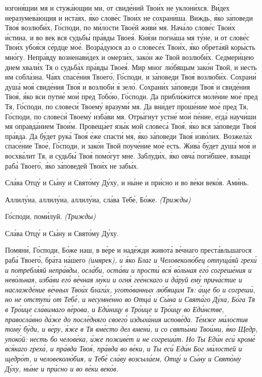 изгоня́щии мя и стужа́ющии ми, от свиде́ний Твои́х не уклони́хся. Ви́дех
неразумева́ющия и иста́ях, я́ко слове́с Твои́х не сохрани́ша. Виждь,
я́ко за́поведи Твоя́ возлюби́х, Го́споди, по ми́лости Твое́й живи́ мя.
Нача́ло слове́с Твои́х и́стина, и во век вся судьбы́ пра́вды Твоея́. Кня́зи
погна́ша мя ту́не, и от слове́с Твои́х убоя́ся се́рдце мое́. Возра́дуюся аз о
словесе́х Твои́х, я́ко обрета́яй коры́сть мно́гу. Непра́вду возненави́дех и
омерзи́х, зако́н же Твой возлюби́х. Седмери́цею днем хвали́х Тя о
судьба́х пра́вды Твоея́. Мир мног лю́бящым зако́н Твой, и несть им
собла́зна. Ча́ях спасе́ния Твоего́, Го́споди, и за́поведи Твоя́ возлюби́х.
Сохрани́ душа́ моя́ свиде́ния Твоя́ и возлюби́ я́ зело́. Сохрани́х за́поведи
Твоя́ и свиде́ния Твоя́, я́ко вси путие́ мои́ пред Тобо́ю, Го́споди. Да
прибли́жится моле́ние мое́ пред Тя, Го́споди, по словеси́ Твоему́ вразуми́
мя. Да вни́дет проше́ние мое́ пред Тя, Го́споди, по словеси́ Твоему́
изба́ви мя. Отры́гнут устне́ мои́ пе́ние, егда́ научи́ши мя оправда́нием
Твои́м. Провеща́ет язы́к мой словеса́ Твоя́, я́ко вся за́поведи Твоя́
пра́вда. Да бу́дет рука́ Твоя́ е́же спасти́ мя, я́ко за́поведи Твоя́ изво́лих.
Возжела́х спасе́ние Твое́, Го́споди, и зако́н Твой поуче́ние мое́ есть.
Жива́ бу́дет душа́ моя́ и восхва́лит Тя, и судьбы́ Твоя́ помо́гут мне.
Заблуди́х, я́ко овча́ поги́бшее, взыщи́ раба́ Твоего́, я́ко за́поведей Твои́х не
забы́х.
   


   Сла́ва Отцу́ и Сы́ну и Свято́му Ду́ху, и ны́не и при́сно и во ве́ки веко́в.
Ами́нь.


   Аллилу́иа, аллилу́иа, аллилу́иа, сла́ва Тебе́, Бо́же. \itshape (Трижды)\normalfont{}


   Го́споди, поми́луй. \itshape (Трижды)\normalfont{}


   Сла́ва Отцу́ и Сы́ну и Свято́му Ду́ху.


   Помяни́, Го́споди, Бо́же наш, в ве́ре и наде́жди живота́ ве́чнаго
преста́вльшагося раба́ Твоего́, бра́та на́шего \itshape (имярек)\normalfont{}, и я́ко Благ и
Человеколю́бец отпуща́яй грехи́ и потребля́яй непра́вды, осла́би, оста́ви и
прости́ вся́ во́льная его́ согреше́ния и нево́льная, изба́ви его́ ве́чная му́ки и
огня́ гее́нскаго и да́руй ему́ прича́стие и наслажде́ние ве́чных Твои́х благи́х,
угото́ванных лю́бящим Тя: а́ще бо и согреши́, но не отступи́ от Тебе́, и
несумне́нно во Отца́ и Сы́на и Свята́го Ду́ха, Бо́га Тя в Тро́ице сла́вимаго
ве́рова, и Еди́ницу в Тро́ице и Тро́ицу во Еди́нстве, правосла́вно да́же
до после́дняго своего́ издыха́ния испове́да. Те́мже ми́лостив тому́
бу́ди, и ве́ру, я́же в Тя вме́сто дел вмени́, и со святы́ми Твои́ми, я́ко
Щедр, упоко́й: несть бо челове́ка, и́же поживе́т и не согреши́т. Но Ты
Еди́н еси́ кроме́ вся́каго греха́, и пра́вда Твоя́, пра́вда во ве́ки, и Ты
еси́ Еди́н Бог ми́лостей и щедро́т, и человеколю́бия, и Тебе́ сла́ву
возсыла́ем, Отцу́ и Сы́ну и Свято́му Ду́ху, ны́не и при́сно и во ве́ки веко́в.


